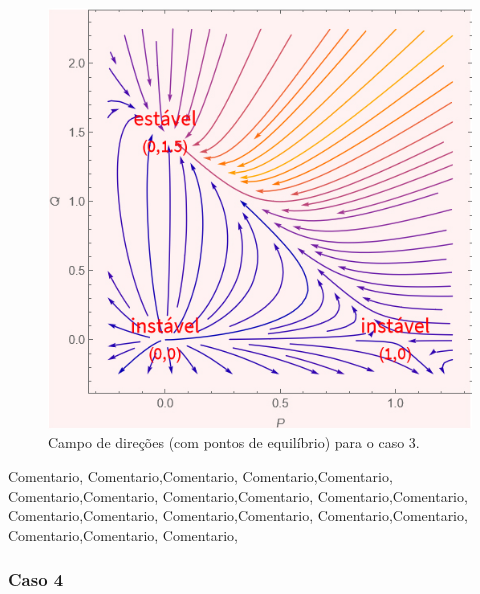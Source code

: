 \bigskip
\begin{figure}[htbp]
\centering
\includegraphics[keepaspectratio=true,scale=0.8]{caso3_c.jpg}
\caption{Campo de direções (com pontos de equilíbrio) para o caso 3.}
\label{fig:zzz}
\end{figure}
\bigskip
\noindent
Comentario, Comentario,Comentario, Comentario,Comentario, Comentario,Comentario, Comentario,Comentario, Comentario,Comentario, Comentario,Comentario, Comentario,Comentario, Comentario,Comentario, Comentario,Comentario, Comentario,

















\pagebreak
\subsubsection{Caso 4}


